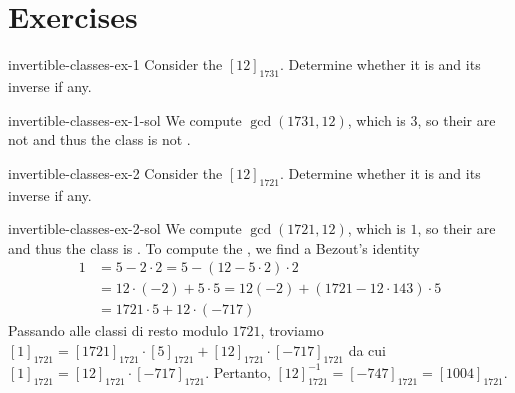 \documentclass[preview]{standalone}
\begin{document}
\genpage

\section{Exercises}

\begin{snippetexercise}{invertible-classes-ex-1}{}
    Consider the \congruenceclass \({[12]}_{1731}\).
    Determine whether it is \invertiblecongclass[invertible] and its inverse if any.
\end{snippetexercise}

\begin{snippetsolution}{invertible-classes-ex-1-sol}{}
    We compute \(\gcd(1731, 12)\), which is
    \(3\), so their are not \coprime and thus the class is not \invertiblecongclass[invertible].
\end{snippetsolution}

\begin{snippetexercise}{invertible-classes-ex-2}{}
    Consider the \congruenceclass \({[12]}_{1721}\).
    Determine whether it is \invertiblecongclass[invertible] and its inverse if any. %
\end{snippetexercise}

\begin{snippetsolution}{invertible-classes-ex-2-sol}{}
    We compute \(\gcd(1721, 12)\), which is
    \(1\), so their are \coprime and thus the class is \invertiblecongclass[invertible].
    To compute the \invertiblecongclass[inverse], we find a Bezout's identity
    \begin{align*}
        1 &= 5 - 2 \cdot 2 = 5-(12 - 5\cdot 2)\cdot 2 \\
        &= 12 \cdot (-2) + 5 \cdot 5 = 12(-2) + (1721 - 12 \cdot 143) \cdot 5 \\
        &= 1721 \cdot 5 + 12 \cdot (-717)
    \end{align*}
    Passando alle classi di resto modulo \(1721\), troviamo
    \({[1]}_{1721} = {[1721]}_{1721} \cdot {[5]}_{1721} + {[12]}_{1721} \cdot {[-717]}_{1721}\)
    da cui \({[1]}_{1721} = {[12]}_{1721} \cdot {[-717]}_{1721}\).
    Pertanto, \({[12]}_{1721}^{-1} = {[-747]}_{1721} = {[1004]}_{1721}\).
\end{snippetsolution}
\end{document}
